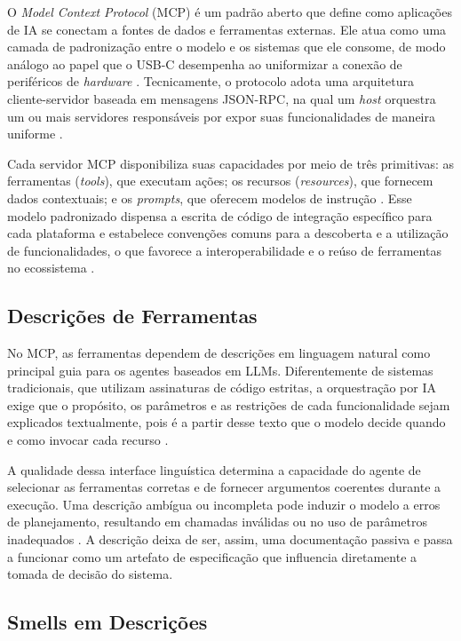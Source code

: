 O \textit{Model Context Protocol} (MCP) é um padrão aberto que define como aplicações de IA se conectam a fontes de dados e ferramentas externas. Ele atua como uma camada de padronização entre o modelo e os sistemas que ele consome, de modo análogo ao papel que o USB-C desempenha ao uniformizar a conexão de periféricos de \textit{hardware} \cite{guo2025measurement}. Tecnicamente, o protocolo adota uma arquitetura cliente-servidor baseada em mensagens JSON-RPC, na qual um \textit{host} orquestra um ou mais servidores responsáveis por expor suas funcionalidades de maneira uniforme \cite{shi2026description}.

Cada servidor MCP disponibiliza suas capacidades por meio de três primitivas: as ferramentas (\textit{tools}), que executam ações; os recursos (\textit{resources}), que fornecem dados contextuais; e os \textit{prompts}, que oferecem modelos de instrução \cite{guo2025measurement}. Esse modelo padronizado dispensa a escrita de código de integração específico para cada plataforma e estabelece convenções comuns para a descoberta e a utilização de funcionalidades, o que favorece a interoperabilidade e o reúso de ferramentas no ecossistema \cite{mcpAtFirstGlance}.

\subsection{Descrições de Ferramentas}

No MCP, as ferramentas dependem de descrições em linguagem natural como principal guia para os agentes baseados em LLMs. Diferentemente de sistemas tradicionais, que utilizam assinaturas de código estritas, a orquestração por IA exige que o propósito, os parâmetros e as restrições de cada funcionalidade sejam explicados textualmente, pois é a partir desse texto que o modelo decide quando e como invocar cada recurso \cite{2026arXiv260214878M}.

A qualidade dessa interface linguística determina a capacidade do agente de selecionar as ferramentas corretas e de fornecer argumentos coerentes durante a execução. Uma descrição ambígua ou incompleta pode induzir o modelo a erros de planejamento, resultando em chamadas inválidas ou no uso de parâmetros inadequados \cite{shi2026description}. A descrição deixa de ser, assim, uma documentação passiva e passa a funcionar como um artefato de especificação que influencia diretamente a tomada de decisão do sistema. 


\subsection{Smells em Descrições}

